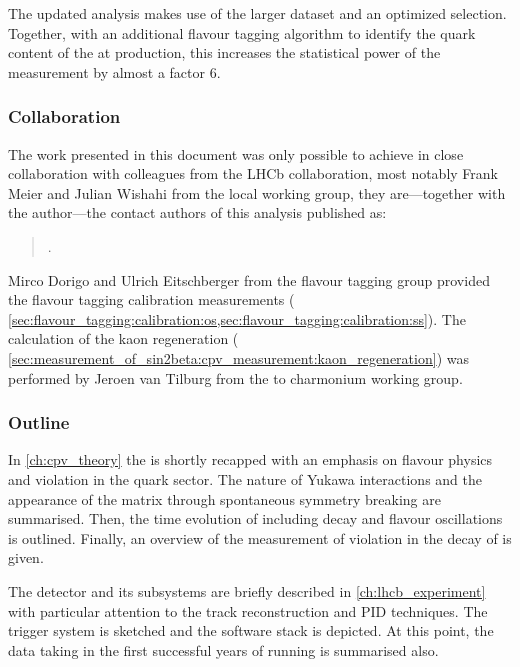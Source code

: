 The updated analysis makes use of the larger dataset and an optimized selection.
Together, with an additional flavour tagging algorithm to identify the quark
content of the \Bmeson at production, this increases the statistical power of
the measurement by almost a factor $\num{6}$.

\subsubsection*{Collaboration}
The work presented in this document was only possible to achieve in close
collaboration with colleagues from the \acs{LHCb} collaboration, most notably
Frank Meier and Julian Wishahi from the local working group, they are---together
with the author---the contact authors of this analysis published as:
%
\begin{quotation}
  .
\end{quotation}

Mirco Dorigo and Ulrich Eitschberger from the flavour tagging group provided the
flavour tagging calibration measurements (\cf
\cref{sec:flavour_tagging:calibration:os,sec:flavour_tagging:calibration:ss}).
The calculation of the kaon regeneration (\cf
\cref{sec:measurement_of_sin2beta:cpv_measurement:kaon_regeneration}) was
performed by Jeroen van Tilburg from the \B to charmonium working group.

\subsubsection*{Outline}

In \cref{ch:cpv_theory} the \SM is shortly recapped with an emphasis on flavour
physics and \CP violation in the quark sector. The nature of Yukawa
interactions and the appearance of the \CKM matrix through spontaneous symmetry
breaking are summarised. Then, the time evolution of \Bmesons including decay
and flavour oscillations is outlined. Finally, an overview of the measurement of
\CP violation in the decay of \BdToJpsiKS is given.

The \LHCb detector and its subsystems are briefly described in
\cref{ch:lhcb_experiment} with particular attention to the track reconstruction
and \acl{PID} techniques. The \LHCb trigger system is sketched and the software
stack is depicted. At this point, the data taking in the first successful years
of running is summarised also.

